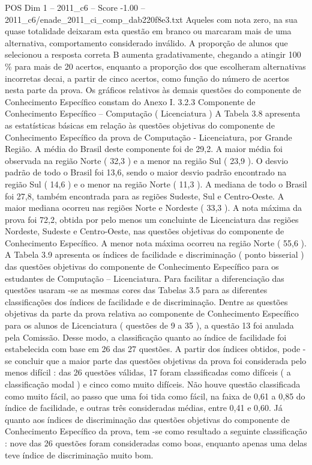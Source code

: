\begin{textsample}{POS Dim 1 – 2011\_c6 – Score -1.00 – 2011\_c6/enade\_2011\_ci\_comp\_dab220f8e3.txt}
Aqueles com nota zero, na sua quase totalidade deixaram esta questão em branco ou marcaram mais de uma alternativa, comportamento considerado inválido.
A proporção de alunos que selecionou a resposta correta B aumenta gradativamente, chegando a atingir 100 \% para mais de 20 acertos, enquanto a proporção dos que escolheram alternativas incorretas decai, a partir de cinco acertos, como função do número de acertos nesta parte da prova.
Os gráficos relativos às demais questões do componente de Conhecimento Específico constam do Anexo I. 3.2.3 Componente de Conhecimento Específico – Computação ( Licenciatura ) A Tabela 3.8 apresenta as estatísticas básicas em relação às questões objetivas do componente de Conhecimento Específico da prova de Computação - Licenciatura, por Grande Região.
A média do Brasil deste componente foi de 29,2.
A maior média foi observada na região Norte ( 32,3 ) e a menor na região Sul ( 23,9 ).
O desvio padrão de todo o Brasil foi 13,6, sendo o maior desvio padrão encontrado na região Sul ( 14,6 ) e o menor na região Norte ( 11,3 ).
A mediana de todo o Brasil foi 27,8, também encontrada para as regiões Sudeste, Sul e Centro-Oeste.
A maior mediana ocorreu nas regiões Norte e Nordeste ( 33,3 ).
A nota máxima da prova foi 72,2, obtida por pelo menos um concluinte de Licenciatura das regiões Nordeste, Sudeste e Centro-Oeste, nas questões objetivas do componente de Conhecimento Específico.
A menor nota máxima ocorreu na região Norte ( 55,6 ).
A Tabela 3.9 apresenta os índices de facilidade e discriminação ( ponto bisserial ) das questões objetivas do componente de Conhecimento Específico para os estudantes de Computação – Licenciatura.
Para facilitar a diferenciação das questões usaram -se as mesmas cores das Tabelas 3.5 para as diferentes classificações dos índices de facilidade e de discriminação.
Dentre as questões objetivas da parte da prova relativa ao componente de Conhecimento Específico para os alunos de Licenciatura ( questões de 9 a 35 ), a questão 13 foi anulada pela Comissão.
Desse modo, a classificação quanto ao índice de facilidade foi estabelecida com base em 26 das 27 questões.
A partir dos índices obtidos, pode -se concluir que a maior parte das questões objetivas da prova foi considerada pelo menos difícil : das 26 questões válidas, 17 foram classificadas como difíceis ( a classificação modal ) e cinco como muito difíceis.
Não houve questão classificada como muito fácil, ao passo que uma foi tida como fácil, na faixa de 0,61 a 0,85 do índice de facilidade, e outras três consideradas médias, entre 0,41 e 0,60.
Já quanto aos índices de discriminação das questões objetivas do componente de Conhecimento Específico da prova, tem -se como resultado a seguinte classificação : nove das 26 questões foram consideradas como boas, enquanto apenas uma delas teve índice de discriminação muito bom.

\end{textsample}
